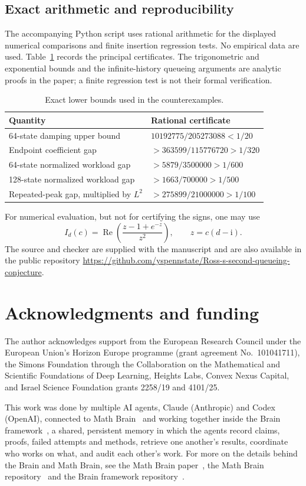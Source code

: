 \documentclass[aap,preprint]{imsart}
\numberwithin{equation}{section}
\theoremstyle{plain}
\theoremstyle{definition}
\newcommand{\1}{\mathbf 1}
\newcommand{\ii}{\mathrm i}
\DeclareMathOperator{\Rea}{Re}
\begin{document}
\begin{appendix}
\section{Exact arithmetic and reproducibility}\label{app:check}
The accompanying Python script uses rational arithmetic for the displayed numerical comparisons and finite insertion regression tests. No empirical data are used. Table~\ref{tab:constants} records the principal certificates. The trigonometric and exponential bounds and the infinite-history queueing arguments are analytic proofs in the paper; a finite regression test is not their formal verification.
\begin{table}[ht]
\caption{Exact lower bounds used in the counterexamples.}\label{tab:constants}
\centering
\begin{tabular}{@{}ll@{}}
\toprule
Quantity & Rational certificate\\
\midrule
64-state damping upper bound & $10192775/205273088<1/20$\\
Endpoint coefficient gap & $>363599/115776720>1/320$\\
64-state normalized workload gap & $>5879/3500000>1/600$\\
128-state normalized workload gap & $>1663/700000>1/500$\\
Repeated-peak gap, multiplied by $L^2$ & $>275899/21000000>1/100$\\
\bottomrule
\end{tabular}
\end{table}
For numerical evaluation, but not for certifying the signs, one may use
\[
 I_d(c)=\Rea\left(\frac{z-1+e^{-z}}{z^2}\right),\qquad z=c(d-\ii).
\]
The source and checker are supplied with the manuscript and are also available in the public repository
\url{https://github.com/yspennstate/Ross-s-second-queueing-conjecture}.
\end{appendix}

\section*{Acknowledgments and funding}
The author acknowledges support from the European Research Council under the European Union's Horizon Europe programme (grant agreement No.~101041711), the Simons Foundation through the Collaboration on the Mathematical and Scientific Foundations of Deep Learning, Heights Labs, Convex Nexus Capital, and Israel Science Foundation grants 2258/19 and 4101/25.

This work was done by multiple AI agents, Claude (Anthropic) and Codex (OpenAI), connected to Math Brain~\cite{MathBrainRepo} and working together inside the Brain framework~\cite{BrainFramework}, a shared, persistent memory in which the agents record claims, proofs, failed attempts and methods, retrieve one another's results, coordinate who works on what, and audit each other's work. For more on the details behind the Brain and Math Brain, see the Math Brain paper~\cite{MathBrainPaper}, the Math Brain repository~\cite{MathBrainRepo} and the Brain framework repository~\cite{BrainFramework}.
\end{document}
